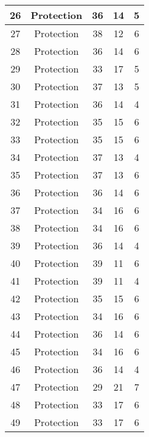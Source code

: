 \documentclass[results.tex]{subfiles}
\begin{document}
\begin{center}
\begin{tabular}{| c || c | c | c | c |}
    \hline
    26 & Protection & 36 & 14 & 5 \\ 
    \hline
    27 & Protection & 38 & 12 & 6 \\ 
    \hline
    28 & Protection & 36 & 14 & 6 \\ 
    \hline
    29 & Protection & 33 & 17 & 5 \\ 
    \hline
    30 & Protection & 37 & 13 & 5 \\ 
    \hline
    31 & Protection & 36 & 14 & 4 \\ 
    \hline
    32 & Protection & 35 & 15 & 6 \\ 
    \hline
    33 & Protection & 35 & 15 & 6 \\ 
    \hline
    34 & Protection & 37 & 13 & 4 \\ 
    \hline
    35 & Protection & 37 & 13 & 6 \\ 
    \hline
    36 & Protection & 36 & 14 & 6 \\ 
    \hline
    37 & Protection & 34 & 16 & 6 \\ 
    \hline
    38 & Protection & 34 & 16 & 6 \\ 
    \hline
    39 & Protection & 36 & 14 & 4 \\ 
    \hline
    40 & Protection & 39 & 11 & 6 \\ 
    \hline
    41 & Protection & 39 & 11 & 4 \\ 
    \hline
    42 & Protection & 35 & 15 & 6 \\ 
    \hline
    43 & Protection & 34 & 16 & 6 \\ 
    \hline
    44 & Protection & 36 & 14 & 6 \\ 
    \hline
    45 & Protection & 34 & 16 & 6 \\ 
    \hline
    46 & Protection & 36 & 14 & 4 \\ 
    \hline
    47 & Protection & 29 & 21 & 7 \\ 
    \hline
    48 & Protection & 33 & 17 & 6 \\ 
    \hline
    49 & Protection & 33 & 17 & 6 \\ 
    \hline   \end{tabular}
\end{center}
\end{document}
